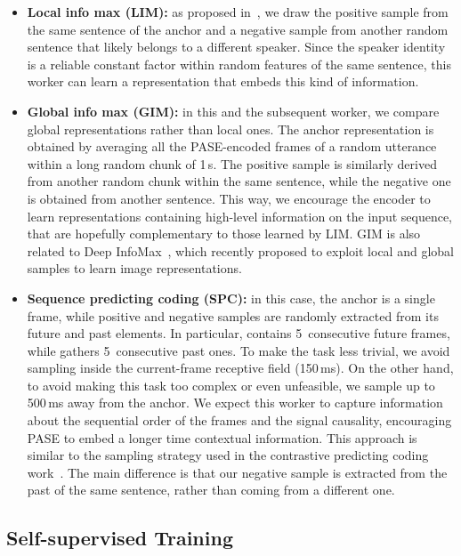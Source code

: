 \documentclass[a4paper]{article}
\begin{document}
\begin{itemize}
  \item \textbf{Local info max (LIM):} as proposed in~\cite{ravanelli2018learning}, we draw the positive sample from the same sentence of the anchor and a negative sample from another random sentence that likely belongs to a different speaker. Since the speaker identity is a reliable constant factor within random features of the same sentence, this worker can learn a representation that embeds this kind of information.
  
  \item \textbf{Global info max (GIM):} 
in this and the subsequent worker, we compare global representations rather than local ones. The anchor representation is obtained by averaging all the PASE-encoded frames of a random utterance within a long random chunk of 1\,s. The positive sample is similarly derived from another random chunk within the same sentence, while the negative one is obtained from another sentence. This way, we encourage the encoder to learn representations containing high-level information on the input sequence, that are hopefully complementary to those learned by LIM. GIM is also related to Deep InfoMax~\cite{hjelm2018learning}, which recently proposed to exploit local and global samples to learn image representations.

 
  \item \textbf{Sequence predicting coding (SPC):} in this case, the anchor is a single frame, while positive and negative samples are randomly extracted from its future and past elements. In particular,  contains 5~consecutive future frames, while  gathers 5~consecutive past ones. To make the task less trivial, we avoid sampling inside the current-frame receptive field (150\,ms). On the other hand, to avoid making this task too complex or even unfeasible, we sample up to 500\,ms away from the anchor. We expect this worker to capture information about the sequential order of the frames and the signal causality, encouraging PASE to embed a longer time contextual information. This approach is similar to the sampling strategy used in the contrastive predicting coding work~\cite{van2017neural}. The main difference is that our negative sample is extracted from the past of the same sentence, rather than coming from a different one. 

\end{itemize}


\subsection{Self-supervised Training}
\label{sec:exp_setup_semisuptrain}
\end{document}

